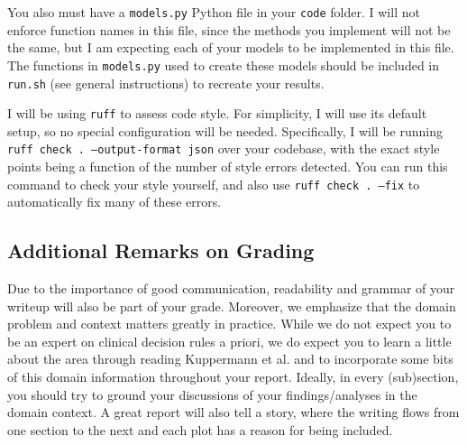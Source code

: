 \documentclass[10pt,letterpaper]{article}
\begin{document}
You also must have a \texttt{models.py} Python file in your \texttt{code} folder. I will not enforce function names in this file, since the methods you implement will not be the same, but I am expecting each of your models to be implemented in this file. The functions in \texttt{models.py} used to create these models should be included in \texttt{run.sh} (see general instructions) to recreate your results.

I will be using \texttt{ruff} to assess code style. For simplicity, I will use its default setup, so no special configuration will be needed. Specifically, I will be running \texttt{ruff check . --output-format json} over your codebase, with the exact style points being a function of the number of style errors detected. You can run this command to check your style yourself, and also use \texttt{ruff check . --fix} to automatically fix many of these errors.

\subsection*{Additional Remarks on Grading}

Due to the importance of good communication, readability and grammar of your writeup will also be part of your grade. Moreover, we emphasize that the domain problem and context matters greatly in practice. While we do not expect you to be an expert on clinical decision rules a priori, we do expect you to learn a little about the area through reading Kuppermann et al. and to incorporate some bits of this domain information throughout your report. Ideally, in every (sub)section, you should try to ground your discussions of your findings/analyses in the domain context. A great report will also tell a story, where the writing flows from one section to the next and each plot has a reason for being included.
\end{document}
